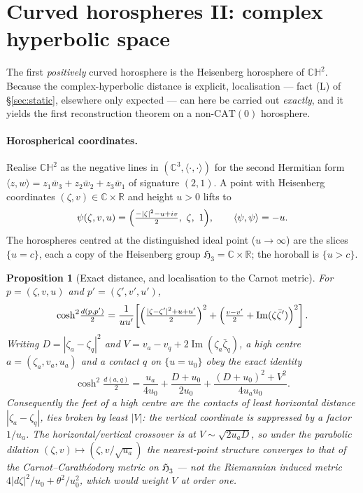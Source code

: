 \documentclass[11pt]{article}
\newtheorem{proposition}[theorem]{Proposition}
\theoremstyle{remark}
\newcommand{\R}{\mathbb{R}}
\begin{document}
\section{Curved horospheres II: complex hyperbolic space}
\label{sec:ch2}

The first \emph{positively} curved horosphere is the Heisenberg
horosphere of $\mathbb{CH}^{2}$. Because the complex-hyperbolic
distance is explicit, localisation --- fact (L) of \S\ref{sec:static},
elsewhere only expected --- can here be carried out \emph{exactly}, and
it yields the first reconstruction theorem on a non-$\mathrm{CAT}(0)$
horosphere.

\paragraph{Horospherical coordinates.} Realise $\mathbb{CH}^{2}$ as the
negative lines in $(\mathbb{C}^{3},\langle\cdot,\cdot\rangle)$ for the
second Hermitian form $\langle z,w\rangle=z_{1}\bar w_{3}+z_{2}\bar
w_{2}+z_{3}\bar w_{1}$ of signature $(2,1)$. A point with Heisenberg
coordinates $(\zeta,v)\in\mathbb{C}\times\R$ and height $u>0$ lifts to
\[
  \psi(\zeta,v,u)=\Bigl(\tfrac{-|\zeta|^{2}-u+iv}{2},\ \zeta,\ 1\Bigr),
  \qquad \langle\psi,\psi\rangle=-u .
\]
The horospheres centred at the distinguished ideal point
($u\to\infty$) are the slices $\{u=c\}$, each a copy of the Heisenberg
group $\mathfrak{H}_{3}=\mathbb{C}\times\R$; the horoball is $\{u>c\}$.

\begin{proposition}[Exact distance, and localisation to the Carnot
metric]\label{prop:ch2}
For $p=(\zeta,v,u)$ and $p'=(\zeta',v',u')$,
\[
  \cosh^{2}\!\tfrac{d(p,p')}{2}
  =\frac{1}{uu'}\!\left[\Bigl(\tfrac{|\zeta-\zeta'|^{2}+u+u'}{2}\Bigr)^{2}
  +\Bigl(\tfrac{v-v'}{2}+\operatorname{Im}(\zeta\bar\zeta')\Bigr)^{2}\right].
\]
Writing $D=|\zeta_{a}-\zeta_{q}|^{2}$ and
$V=v_{a}-v_{q}+2\operatorname{Im}(\zeta_{a}\bar\zeta_{q})$, a high
centre $a=(\zeta_{a},v_{a},u_{a})$ and a contact $q$ on $\{u=u_{0}\}$
obey the \emph{exact} identity
\[
  \cosh^{2}\!\tfrac{d(a,q)}{2}
  =\frac{u_{a}}{4u_{0}}+\frac{D+u_{0}}{2u_{0}}
  +\frac{(D+u_{0})^{2}+V^{2}}{4u_{a}u_{0}} .
\]
Consequently the feet of a high centre are the contacts of least
\emph{horizontal} distance $|\zeta_{a}-\zeta_{q}|$, ties broken by
least $|V|$: the vertical coordinate is suppressed by a factor
$1/u_{a}$. The horizontal/vertical crossover is at
$V\sim\sqrt{2u_{a}D}$, so under the parabolic dilation
$(\zeta,v)\mapsto(\zeta,v/\sqrt{u_{a}})$ the nearest-point structure
converges to that of the Carnot--Carath\'eodory metric on
$\mathfrak{H}_{3}$ --- \emph{not} the Riemannian induced metric
$4|d\zeta|^{2}/u_{0}+\theta^{2}/u_{0}^{2}$, which would weight $V$ at
order one.
\end{proposition}
\end{document}
